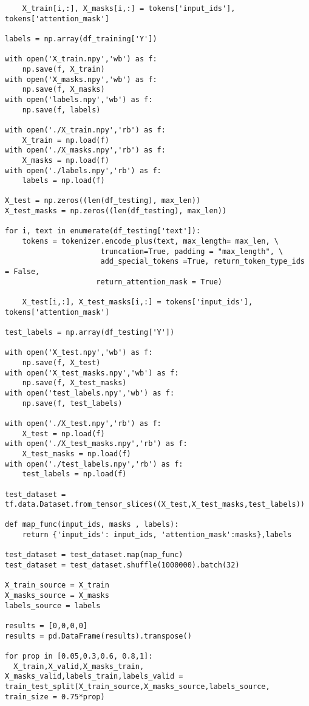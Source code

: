 \documentclass[10pt,riqno,a4paper,twoside]{article}\usepackage[]{graphicx}\usepackage[]{color}
\begin{document}
\begin{lstlisting}
    X_train[i,:], X_masks[i,:] = tokens['input_ids'], tokens['attention_mask']

labels = np.array(df_training['Y'])

with open('X_train.npy','wb') as f:
    np.save(f, X_train)
with open('X_masks.npy','wb') as f:
    np.save(f, X_masks)
with open('labels.npy','wb') as f:
    np.save(f, labels)

with open('./X_train.npy','rb') as f:
    X_train = np.load(f)
with open('./X_masks.npy','rb') as f:
    X_masks = np.load(f)
with open('./labels.npy','rb') as f:
    labels = np.load(f)

X_test = np.zeros((len(df_testing), max_len))
X_test_masks = np.zeros((len(df_testing), max_len))

for i, text in enumerate(df_testing['text']):
    tokens = tokenizer.encode_plus(text, max_length= max_len, \
                      truncation=True, padding = "max_length", \
                      add_special_tokens =True, return_token_type_ids = False,
                     return_attention_mask = True)
    
    X_test[i,:], X_test_masks[i,:] = tokens['input_ids'], tokens['attention_mask']
    
test_labels = np.array(df_testing['Y'])

with open('X_test.npy','wb') as f:
    np.save(f, X_test)
with open('X_test_masks.npy','wb') as f:
    np.save(f, X_test_masks)
with open('test_labels.npy','wb') as f:
    np.save(f, test_labels)

with open('./X_test.npy','rb') as f:
    X_test = np.load(f)
with open('./X_test_masks.npy','rb') as f:
    X_test_masks = np.load(f)
with open('./test_labels.npy','rb') as f:
    test_labels = np.load(f)

test_dataset = tf.data.Dataset.from_tensor_slices((X_test,X_test_masks,test_labels))

def map_func(input_ids, masks , labels):
    return {'input_ids': input_ids, 'attention_mask':masks},labels

test_dataset = test_dataset.map(map_func)
test_dataset = test_dataset.shuffle(1000000).batch(32)

X_train_source = X_train
X_masks_source = X_masks
labels_source = labels

results = [0,0,0,0]
results = pd.DataFrame(results).transpose()

for prop in [0.05,0.3,0.6, 0.8,1]:
  X_train,X_valid,X_masks_train, X_masks_valid,labels_train,labels_valid = train_test_split(X_train_source,X_masks_source,labels_source, train_size = 0.75*prop)


\end{lstlisting}
\end{document}
